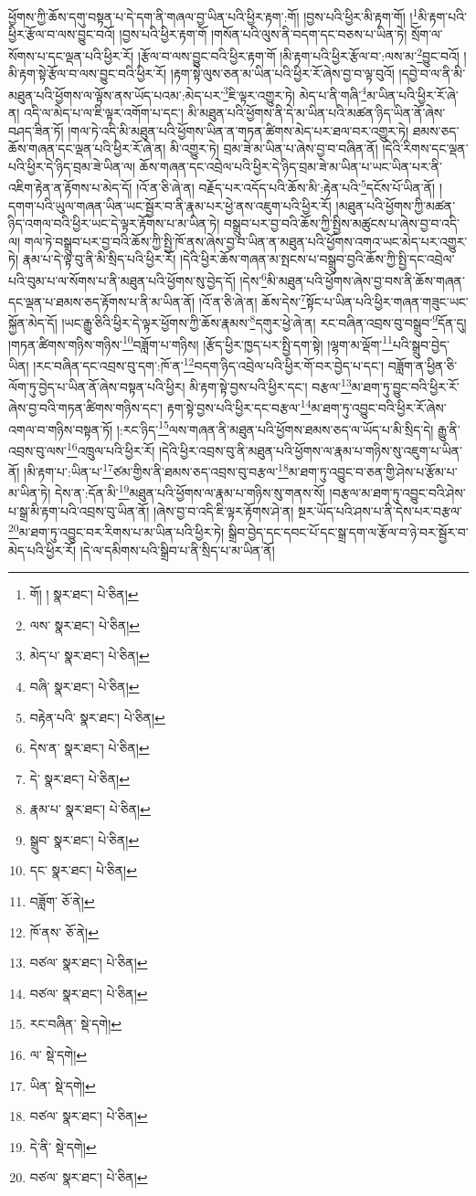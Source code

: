 ཕྱོགས་ཀྱི་ཆོས་དགུ་བསྟན་པ་དེ་དག་ནི་གཞལ་བྱ་ཡིན་པའི་ཕྱིར་རྟག་:གོ། །བྱས་པའི་ཕྱིར་མི་རྟག་གོ། །\footnote{གོ། །  སྣར་ཐང་།  པེ་ཅིན། }མི་རྟག་པའི་ཕྱིར་རྩོལ་བ་ལས་བྱུང་བའོ། །བྱས་པའི་ཕྱིར་རྟག་གོ །གསོན་པའི་ལུས་ནི་བདག་དང་བཅས་པ་ཡིན་ཏེ། སྲོག་ལ་སོགས་པ་དང་ལྡན་པའི་ཕྱིར་རོ། །རྩོལ་བ་ལས་བྱུང་བའི་ཕྱིར་རྟག་གོ །མི་རྟག་པའི་ཕྱིར་རྩོལ་བ་:ལས་མ་\footnote{ལས་  སྣར་ཐང་།  པེ་ཅིན། }བྱུང་བའོ། །མི་རྟག་སྟེ་རྩོལ་བ་ལས་བྱུང་བའི་ཕྱིར་རོ། །རྟག་སྟེ་ལུས་ཅན་མ་ཡིན་པའི་ཕྱིར་རོ་ཞེས་བྱ་བ་ལྟ་བུའོ། །དབྱེ་བ་ལ་ནི་མི་མཐུན་པའི་ཕྱོགས་ལ་ལྟོས་ནས་ཡོད་པའམ་:མེད་པར་\footnote{མེད་པ་  སྣར་ཐང་།  པེ་ཅིན། }ཇི་ལྟར་འགྱུར་ཏེ། མེད་པ་ནི་གཞི་\footnote{བཞི་  སྣར་ཐང་།  པེ་ཅིན། }མ་ཡིན་པའི་ཕྱིར་རོ་ཞེ་ན། འདི་ལ་མེད་པ་ལ་ཇི་ལྟར་འགོག་པ་དང་། མི་མཐུན་པའི་ཕྱོགས་ནི་དེ་མ་ཡིན་པའི་མཚན་ཉིད་ཡིན་ནོ་ཞེས་བཤད་ཟིན་ཏོ། །གལ་ཏེ་འདི་མི་མཐུན་པའི་ཕྱོགས་ཡིན་ན་གཏན་ཚིགས་མེད་པར་ཐལ་བར་འགྱུར་ཏེ། ཐམས་ཅད་ཆོས་གཞན་དང་ལྡན་པའི་ཕྱིར་རོ་ཞེ་ན། མི་འགྱུར་ཏེ། བྲམ་ཟེ་མ་ཡིན་པ་ཞེས་བྱ་བ་བཞིན་ནོ། །དེའི་རིགས་དང་ལྡན་པའི་ཕྱིར་དེ་ཉིད་བྲམ་ཟེ་ཡིན་ལ། ཆོས་གཞན་དང་འབྲེལ་པའི་ཕྱིར་དེ་ཉིད་བྲམ་ཟེ་མ་ཡིན་པ་ཡང་ཡིན་པར་ནི་འཇིག་རྟེན་ན་རྟོགས་པ་མེད་དོ། །འོ་ན་ཅི་ཞེ་ན། བརྗོད་པར་འདོད་པའི་ཆོས་མི་:རྟེན་པའི་\footnote{བརྟེན་པའི་  སྣར་ཐང་།  པེ་ཅིན། }དངོས་པོ་ཡིན་ནོ། །དགག་པའི་ཡུལ་གཞན་ཡིན་ཡང་སྦྱོར་བ་ནི་རྣམ་པར་ཕྱེ་ནས་འཇུག་པའི་ཕྱིར་རོ། །མཐུན་པའི་ཕྱོགས་ཀྱི་མཚན་ཉིད་འགལ་བའི་ཕྱིར་ཡང་དེ་ལྟར་རྟོགས་པ་མ་ཡིན་ཏེ། བསྒྲུབ་པར་བྱ་བའི་ཆོས་ཀྱི་སྤྱིས་མཚུངས་པ་ཞེས་བྱ་བ་འདི་ལ། གལ་ཏེ་བསྒྲུབ་པར་བྱ་བའི་ཆོས་ཀྱི་སྤྱི་ཁོ་ནས་ཞེས་བྱ་བ་ཡིན་ན་མཐུན་པའི་ཕྱོགས་འགའ་ཡང་མེད་པར་འགྱུར་ཏེ། རྣམ་པ་དེ་ལྟ་བུ་ནི་མི་སྲིད་པའི་ཕྱིར་རོ། །དེའི་ཕྱིར་ཆོས་གཞན་མ་སྤངས་པ་བསྒྲུབ་བྱའི་ཆོས་ཀྱི་སྤྱི་དང་འབྲེལ་པའི་བུམ་པ་ལ་སོགས་པ་ནི་མཐུན་པའི་ཕྱོགས་སུ་བྱེད་དོ། །དེས་\footnote{དེས་ན་  སྣར་ཐང་།  པེ་ཅིན། }མི་མཐུན་པའི་ཕྱོགས་ཞེས་བྱ་བས་ནི་ཆོས་གཞན་དང་ལྡན་པ་ཐམས་ཅད་རྟོགས་པ་ནི་མ་ཡིན་ནོ། །འོ་ན་ཅི་ཞེ་ན། ཆོས་དེས་\footnote{དེ་  སྣར་ཐང་།  པེ་ཅིན། }སྟོང་པ་ཡིན་པའི་ཕྱིར་གཞན་གཟུང་ཡང་སྐྱོན་མེད་དོ། །ཡང་རྒྱུ་ཅིའི་ཕྱིར་དེ་ལྟར་ཕྱོགས་ཀྱི་ཆོས་རྣམས་\footnote{རྣམ་པ་  སྣར་ཐང་།  པེ་ཅིན། }དགུར་ཕྱེ་ཞེ་ན། རང་བཞིན་འབྲས་བུ་བསྒྲུབ་\footnote{སྒྲུབ་  སྣར་ཐང་།  པེ་ཅིན། }དོན་དུ། །གཏན་ཚིགས་གཉིས་གཉིས་\footnote{དང་  སྣར་ཐང་།  པེ་ཅིན། }བཟློག་པ་གཉིས། །རྩོད་ཕྱིར་ཁྱད་པར་སྤྱི་དག་སྟེ། །ལྷག་མ་ལྡོག་\footnote{བཟློག་  ཅོ་ནེ། }པའི་སྒྲུབ་བྱེད་ཡིན། །རང་བཞིན་དང་འབྲས་བུ་དག་:ཁོ་ན་\footnote{ཁོ་ནས་  ཅོ་ནེ། }བདག་ཉིད་འབྲེལ་པའི་ཕྱིར་གོ་བར་བྱེད་པ་དང་། བཟློག་ན་ཕྱིན་ཅི་ལོག་ཏུ་བྱེད་པ་ཡིན་ནོ་ཞེས་བསྟན་པའི་ཕྱིར། མི་རྟག་སྟེ་བྱས་པའི་ཕྱིར་དང་། བརྩལ་\footnote{བཙལ་  སྣར་ཐང་།  པེ་ཅིན། }མ་ཐག་ཏུ་བྱུང་བའི་ཕྱིར་རོ་ཞེས་བྱ་བའི་གཏན་ཚིགས་གཉིས་དང་། རྟག་སྟེ་བྱས་པའི་ཕྱིར་དང་བརྩལ་\footnote{བཙལ་  སྣར་ཐང་།  པེ་ཅིན། }མ་ཐག་ཏུ་འབྱུང་བའི་ཕྱིར་རོ་ཞེས་འགལ་བ་གཉིས་བསྟན་ཏོ། །:རང་ཉིད་\footnote{རང་བཞིན་  སྡེ་དགེ། }ལས་གཞན་ནི་མཐུན་པའི་ཕྱོགས་ཐམས་ཅད་ལ་ཡོད་པ་མི་སྲིད་དེ། རྒྱུ་ནི་འབྲས་བུ་ལས་\footnote{ལ་  སྡེ་དགེ། }འཁྲུལ་པའི་ཕྱིར་རོ། །དེའི་ཕྱིར་འབྲས་བུ་ནི་མཐུན་པའི་ཕྱོགས་ལ་རྣམ་པ་གཉིས་སུ་འཇུག་པ་ཡིན་ནོ། །མི་རྟག་པ་:ཡིན་པ་\footnote{ཡིན་  སྡེ་དགེ། }ཙམ་གྱིས་ནི་ཐམས་ཅད་འབྲས་བུ་བརྩལ་\footnote{བཙལ་  སྣར་ཐང་།  པེ་ཅིན། }མ་ཐག་ཏུ་འབྱུང་བ་ཅན་གྱི་ཤེས་པ་རྩོམ་པ་མ་ཡིན་ཏེ། དེས་ན་:དོན་མི་\footnote{དེ་ནི་  སྡེ་དགེ། }མཐུན་པའི་ཕྱོགས་ལ་རྣམ་པ་གཉིས་སུ་གནས་སོ། །བརྩལ་མ་ཐག་ཏུ་འབྱུང་བའི་ཤེས་པ་སྒྲ་མི་རྟག་པའི་འབྲས་བུ་ཡིན་ནོ། །ཞེས་བྱ་བ་འདི་ཇི་ལྟར་རྟོགས་ཤེ་ན། སྔར་ཡོད་པའི་ཤས་པ་ནི་དེས་པར་བརྩལ་\footnote{བཙལ་  སྣར་ཐང་།  པེ་ཅིན། }མ་ཐག་ཏུ་འབྱུང་བར་རིགས་པ་མ་ཡིན་པའི་ཕྱིར་ཏེ། སྒྲིབ་བྱེད་དང་དབང་པོ་དང་སྒྲ་དག་ལ་རྩོལ་བ་ཉེ་བར་སྦྱོར་བ་མེད་པའི་ཕྱིར་རོ། །དེ་ལ་དམིགས་པའི་སྒྲིབ་པ་ནི་སྲིད་པ་མ་ཡིན་ནོ། 